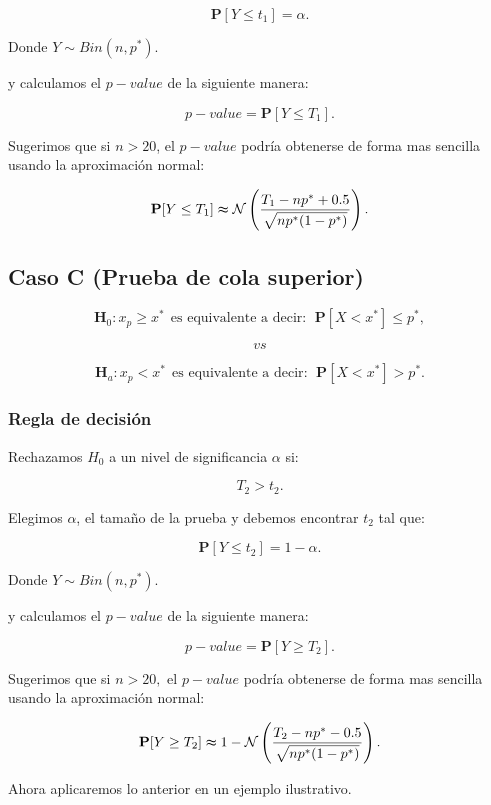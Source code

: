 \documentclass[
  a4paper,
  oneside,
  openany]{book}
\begin{document}
\[\mathbf{P}[Y \leq t_{1}]=\alpha.\]

Donde \(Y \sim Bin (n,p^*)\).

y calculamos el \(p-value\) de la siguiente manera:

\[p-value= \mathbf{P}[Y\leq T_{1}].\]

Sugerimos que si \(n > 20\), el \(p-value\) podría obtenerse de forma mas sencilla usando la aproximación normal:

\[\mathbf{P}[Y\leq T_{1}] \thickapprox \mathcal{N} \left(\frac{T_{1}-np^*+0.5}{\sqrt{np^*(1-p^*)}}\right).\]

\hypertarget{caso-c-prueba-de-cola-superior-1}{%
\subsection*{Caso C (Prueba de cola superior)}\label{caso-c-prueba-de-cola-superior-1}}


\[\textbf{H}_0: x_{p} \geq x^* \ \ \mbox{es equivalente a decir}: \ \ \mathbf{P}[X < x^*]\leq p^*,\]

\[vs\]

\[\textbf{H}_a: x_{p} < x^*  \ \ \mbox{es equivalente a decir}: \ \ \mathbf{P}[X < x^*]> p^*.\]

\hypertarget{regla-de-decisiuxf3n-5}{%
\subsubsection*{Regla de decisión}\label{regla-de-decisiuxf3n-5}}


Rechazamos \(H_0\) a un nivel de significancia \(\alpha\) si:

\[T_{2} > t_{2}.\]

Elegimos \(\alpha\), el tamaño de la prueba y debemos encontrar \(t_{2}\) tal que:

\[\mathbf{P}[Y \leq t_{2}]=1-\alpha.\]

Donde \(Y \sim Bin (n,p^*)\).

y calculamos el \(p-value\) de la siguiente manera:

\[p-value=\mathbf{P}[Y\geq T_{2}].\]

Sugerimos que si \(n > 20,\) el \(p-value\) podría obtenerse de forma mas sencilla usando la aproximación normal:

\[\mathbf{P}[Y\geq T_{2}] \thickapprox 1- \mathcal{N} \left(\frac{T_{2}-np^*-0.5}{\sqrt{np^*(1-p^*)}}\right).\]

Ahora aplicaremos lo anterior en un ejemplo ilustrativo.
\end{document}
